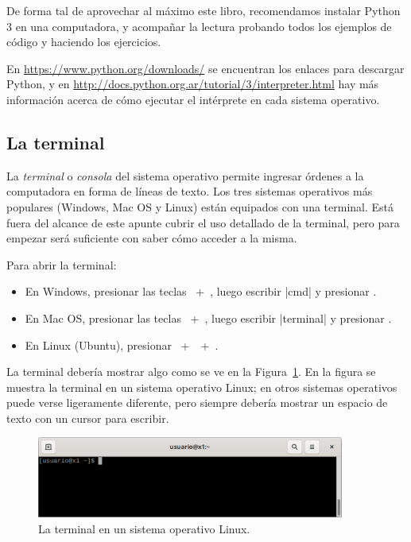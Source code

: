 \begin{atencion}
De forma tal de aprovechar al máximo este libro, recomendamos instalar Python 3
en una computadora, y acompañar la lectura probando todos los ejemplos de
código y haciendo los ejercicios.

En \url{https://www.python.org/downloads/} se encuentran los enlaces para
descargar Python, y en
\url{http://docs.python.org.ar/tutorial/3/interpreter.html} hay más información
acerca de cómo ejecutar el intérprete en cada sistema operativo.
\end{atencion}

\subsection{La terminal}

La \emph{terminal} o \emph{consola} del sistema operativo permite ingresar
órdenes a la computadora en forma de líneas de texto. Los tres sistemas
operativos más populares (Windows, Mac OS y Linux) están equipados con una
terminal. Está fuera del alcance de este apunte cubrir el uso detallado de la
terminal, pero para empezar será suficiente con saber cómo acceder a la misma.

Para abrir la terminal:

\begin{itemize}
        \item En Windows, presionar las teclas ~+~, luego
            escribir |cmd| y presionar .
        \item En Mac OS, presionar las teclas \keys{\cmdmac}~+~,
            luego escribir |terminal|  y presionar .
        \item En Linux (Ubuntu), presionar ~+~~+~.
\end{itemize}

La terminal debería mostrar algo como se ve en la Figura~\ref{fig:terminal1}.
En la figura se muestra la terminal en un sistema operativo Linux; en otros
sistemas operativos puede verse ligeramente diferente, pero siempre debería
mostrar un espacio de texto con un cursor para escribir.

\begin{figure}[ht]
\begin{center}
\includegraphics[width=0.9\textwidth]{graficos/terminal1}
\end{center}
\caption{La terminal en un sistema operativo Linux.}
\label{fig:terminal1}
\end{figure}

